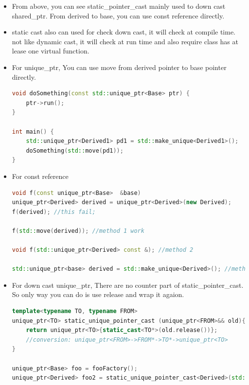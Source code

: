 \documentclass[a4paper,12pt,twoside]{book}
\begin{document}
\begin{itemize}
\item From above, you can see static\_pointer\_cast mainly used to down cast shared\_ptr. From derived to base, you can use const reference directly.

\item static cast also can used for check down cast, it will check at compile time. not like dynamic cast, it will check at run time and also require class has at lease one virtual function.


\item For unique\_ptr, You can use move from derived pointer to base pointer directly.
\begin{lstlisting}[frame=single, language=c++, mathescape=true]
void doSomething(const std::unique_ptr<Base> ptr) {
    ptr->run();
}

int main() {
    std::unique_ptr<Derived1> pd1 = std::make_unique<Derived1>();
    doSomething(std::move(pd1));
}
\end{lstlisting}

\item For const reference  
\begin{lstlisting}[frame=single, language=c++, mathescape=true]
void f(const unique_ptr<Base>  &base)
unique_ptr<Derived> derived = unique_ptr<Derived>(new Derived);
f(derived); //this fail;

f(std::move(derived)); //method 1 work

void f(std::unique_ptr<Derived> const &); //method 2

std::unique_ptr<base> derived = std::make_unique<Derived>(); //method 3
\end{lstlisting}

\item For down cast unique\_ptr, There are no counter part of static\_pointer\_cast. So only way you can do is use release and wrap it agaion.
	

\begin{lstlisting}[frame=single, language=c++, mathescape=true]
template<typename TO, typename FROM>
unique_ptr<TO> static_unique_pointer_cast (unique_ptr<FROM>&& old){
    return unique_ptr<TO>{static_cast<TO*>(old.release())};
    //conversion: unique_ptr<FROM>->FROM*->TO*->unique_ptr<TO>
}

unique_ptr<Base> foo = fooFactory();
unique_ptr<Derived> foo2 = static_unique_pointer_cast<Derived>(std::move(foo));
\end{lstlisting}
\end{itemize}
\end{document}
